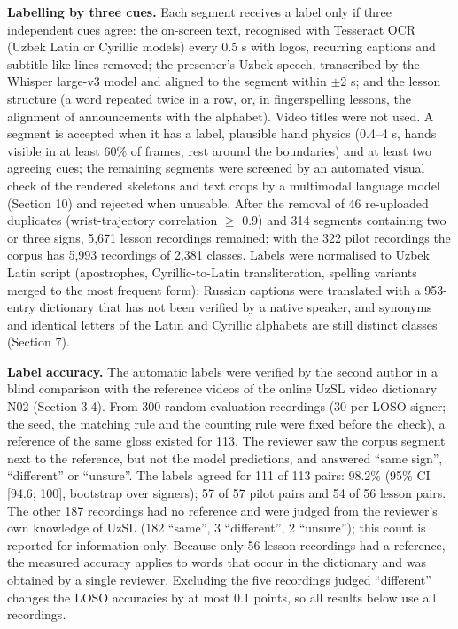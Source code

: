 \documentclass[a4paper,fleqn]{cas-dc}
\begin{document}
\textbf{Labelling by three cues.} Each segment receives a label only if three independent cues agree: the on-screen text, recognised with Tesseract OCR \cite{2007_smith_tesseract} (Uzbek Latin or Cyrillic models) every 0.5 s with logos, recurring captions and subtitle-like lines removed; the presenter's Uzbek speech, transcribed by the Whisper large-v3 model \cite{2023_radford_whisper} and aligned to the segment within $\pm$2 s; and the lesson structure (a word repeated twice in a row, or, in fingerspelling lessons, the alignment of announcements with the alphabet). Video titles were not used. A segment is accepted when it has a label, plausible hand physics (0.4--4 s, hands visible in at least 60\% of frames, rest around the boundaries) and at least two agreeing cues; the remaining segments were screened by an automated visual check of the rendered skeletons and text crops by a multimodal language model (Section 10) and rejected when unusable. After the removal of 46 re-uploaded duplicates (wrist-trajectory correlation $\geq$ 0.9) and 314 segments containing two or three signs, 5,671 lesson recordings remained; with the 322 pilot recordings the corpus has 5,993 recordings of 2,381 classes. Labels were normalised to Uzbek Latin script (apostrophes, Cyrillic-to-Latin transliteration, spelling variants merged to the most frequent form); Russian captions were translated with a 953-entry dictionary that has not been verified by a native speaker, and synonyms and identical letters of the Latin and Cyrillic alphabets are still distinct classes (Section 7).

\textbf{Label accuracy.} The automatic labels were verified by the second author in a blind comparison with the reference videos of the online UzSL video dictionary N02 (Section 3.4). From 300 random evaluation recordings (30 per LOSO signer; the seed, the matching rule and the counting rule were fixed before the check), a reference of the same gloss existed for 113. The reviewer saw the corpus segment next to the reference, but not the model predictions, and answered ``same sign'', ``different'' or ``unsure''. The labels agreed for 111 of 113 pairs: 98.2\% (95\% CI {[}94.6; 100{]}, bootstrap over signers); 57 of 57 pilot pairs and 54 of 56 lesson pairs. The other 187 recordings had no reference and were judged from the reviewer's own knowledge of UzSL (182 ``same'', 3 ``different'', 2 ``unsure''); this count is reported for information only. Because only 56 lesson recordings had a reference, the measured accuracy applies to words that occur in the dictionary and was obtained by a single reviewer. Excluding the five recordings judged ``different'' changes the LOSO accuracies by at most 0.1 points, so all results below use all recordings.
\end{document}
